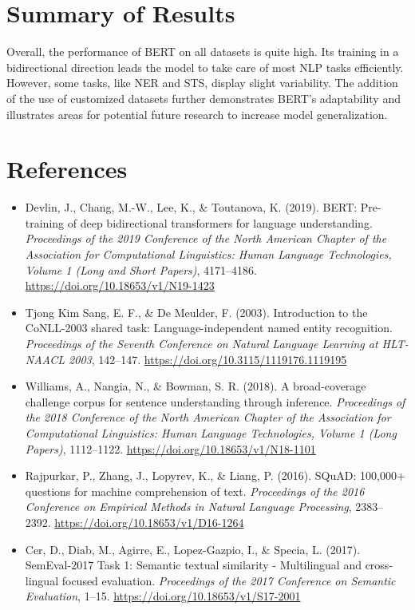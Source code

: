 ﻿\documentclass{article}
\begin{document}
\section{Summary of Results}
Overall, the performance of BERT on all datasets is quite high. Its training in a bidirectional direction leads the model to take care of most NLP tasks efficiently. However, some tasks, like NER and STS, display slight variability. The addition of the use of customized datasets further demonstrates BERT's adaptability and illustrates areas for potential future research to increase model generalization.

\section{References}
\begin{itemize}
    \item Devlin, J., Chang, M.-W., Lee, K., \& Toutanova, K. (2019). BERT: Pre-training of deep bidirectional transformers for language understanding. \textit{Proceedings of the 2019 Conference of the North American Chapter of the Association for Computational Linguistics: Human Language Technologies, Volume 1 (Long and Short Papers)}, 4171–4186. \url{https://doi.org/10.18653/v1/N19-1423}

    \item Tjong Kim Sang, E. F., \& De Meulder, F. (2003). Introduction to the CoNLL-2003 shared task: Language-independent named entity recognition. \textit{Proceedings of the Seventh Conference on Natural Language Learning at HLT-NAACL 2003}, 142–147. \url{https://doi.org/10.3115/1119176.1119195}

    \item Williams, A., Nangia, N., \& Bowman, S. R. (2018). A broad-coverage challenge corpus for sentence understanding through inference. \textit{Proceedings of the 2018 Conference of the North American Chapter of the Association for Computational Linguistics: Human Language Technologies, Volume 1 (Long Papers)}, 1112–1122. \url{https://doi.org/10.18653/v1/N18-1101}

    \item Rajpurkar, P., Zhang, J., Lopyrev, K., \& Liang, P. (2016). SQuAD: 100,000+ questions for machine comprehension of text. \textit{Proceedings of the 2016 Conference on Empirical Methods in Natural Language Processing}, 2383–2392. \url{https://doi.org/10.18653/v1/D16-1264}

    \item Cer, D., Diab, M., Agirre, E., Lopez-Gazpio, I., \& Specia, L. (2017). SemEval-2017 Task 1: Semantic textual similarity - Multilingual and cross-lingual focused evaluation. \textit{Proceedings of the 2017 Conference on Semantic Evaluation}, 1–15. \url{https://doi.org/10.18653/v1/S17-2001}


\end{itemize}
\end{document}
